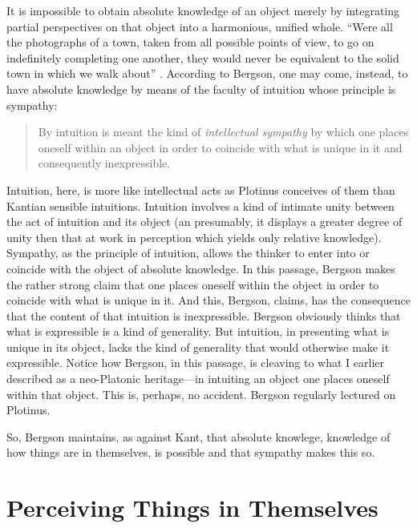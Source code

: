 It is impossible to obtain absolute knowledge of an object merely by integrating partial perspectives on that object into a harmonious, unified whole. ``Were all the photographs of a town, taken from all possible points of view, to go on indefinitely completing one another, they would never be equivalent to the solid town in which we walk about'' \citep[5]{Bergson:1912ud}. According to Bergson, one may come, instead, to have absolute knowledge by means of the faculty of intuition whose principle is sympathy:
\begin{quote}
	By intuition is meant the kind of \emph{intellectual sympathy} by which one places oneself within an object in order to coincide with what is unique in it and consequently inexpressible. \citep[7]{Bergson:1912ud}
\end{quote}
Intuition, here, is more like intellectual acts as Plotinus conceives of them than Kantian sensible intuitions. Intuition involves a kind of intimate unity between the act of intuition and its object (an presumably, it displays a greater degree of unity then that at work in perception which yields only relative knowledge). Sympathy, as the principle of intuition, allows the thinker to enter into or coincide with the object of absolute knowledge. In this passage, Bergson makes the rather strong claim that one places oneself within the object in order to coincide with what is unique in it. And this, Bergson, claims, has the consequence that the content of that intuition is inexpressible. Bergson obviously thinks that what is expressible is a kind of generality. But intuition, in presenting what is unique in its object, lacks the kind of generality that would otherwise make it expressible. Notice how Bergson, in this passage, is cleaving to what I earlier described as a neo-Platonic heritage---in intuiting an object one places oneself within that object. This is, perhaps, no accident. Bergson regularly lectured on Plotinus.

So, Bergson maintains, as against Kant, that absolute knowlege, knowledge of how things are in themselves, is possible and that sympathy makes this so. 


\section{Perceiving Things in Themselves} %
\label{sec:perceiving_things_in_themselves}

